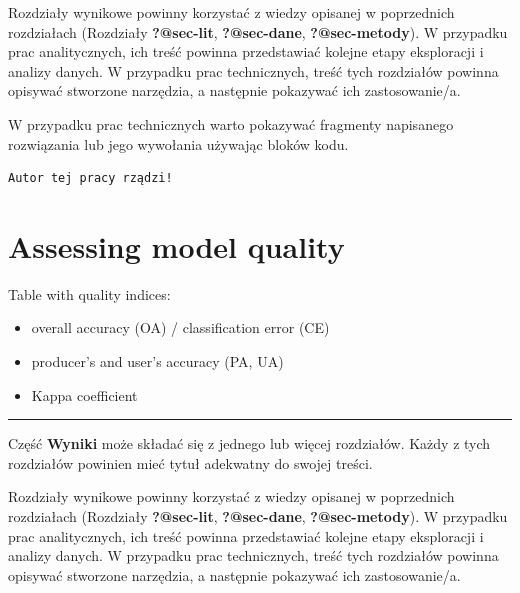 \documentclass{amuthesis}
\begin{document}
Rozdziały wynikowe powinny korzystać z wiedzy opisanej w poprzednich
rozdziałach (Rozdziały \textbf{?@sec-lit}, \textbf{?@sec-dane},
\textbf{?@sec-metody}). W przypadku prac analitycznych, ich treść
powinna przedstawiać kolejne etapy eksploracji i analizy danych. W
przypadku prac technicznych, treść tych rozdziałów powinna opisywać
stworzone narzędzia, a następnie pokazywać ich zastosowanie/a.

W przypadku prac technicznych warto pokazywać fragmenty napisanego
rozwiązania lub jego wywołania używając bloków kodu.

\begin{Shaded}
\begin{Highlighting}[]
\OtherTok{=} 
  \NormalTok{)}
\NormalTok{\}}
\NormalTok{(}\NormalTok{)}
\end{Highlighting}
\end{Shaded}

\begin{verbatim}
Autor tej pracy rządzi!
\end{verbatim}


\hypertarget{sec-results-eval}{%
\chapter{Assessing model quality}\label{sec-results-eval}}

Table with quality indices:

\begin{itemize}
\item
  overall accuracy (OA) / classification error (CE)
\item
  producer's and user's accuracy (PA, UA)
\item
  Kappa coefficient
\end{itemize}

\begin{center}\rule{0.5\linewidth}{0.5pt}\end{center}

Część \textbf{Wyniki} może składać się z jednego lub więcej rozdziałów.
Każdy z tych rozdziałów powinien mieć tytuł adekwatny do swojej treści.

Rozdziały wynikowe powinny korzystać z wiedzy opisanej w poprzednich
rozdziałach (Rozdziały \textbf{?@sec-lit}, \textbf{?@sec-dane},
\textbf{?@sec-metody}). W przypadku prac analitycznych, ich treść
powinna przedstawiać kolejne etapy eksploracji i analizy danych. W
przypadku prac technicznych, treść tych rozdziałów powinna opisywać
stworzone narzędzia, a następnie pokazywać ich zastosowanie/a.
\end{document}
